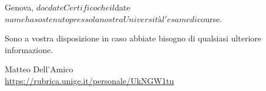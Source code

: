 \documentclass{letter}
\begin{document}
Genova, $docdate

Certifico che il $date $name ha sostenuto presso la nostra Università
l'esame di $course.

Sono a vostra disposizione in caso abbiate bisogno di qualsiasi ulteriore
informazione.

\begin{FlushRight}
Matteo Dell'Amico\\
\url{https://rubrica.unige.it/personale/UkNGW1tu}
\end{FlushRight}
\end{document}
